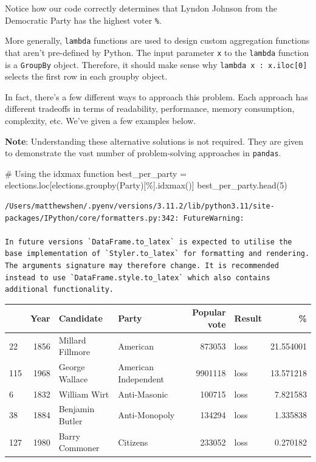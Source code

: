 \documentclass[
  letterpaper,
  DIV=11,
  numbers=noendperiod]{scrreprt}
\newenvironment{Shaded}{\begin{snugshade}}{\end{snugshade}}
\newcommand{\CommentTok}[1]{\textcolor[rgb]{0.37,0.37,0.37}{#1}}
\newcommand{\DecValTok}[1]{\textcolor[rgb]{0.68,0.00,0.00}{#1}}
\newcommand{\NormalTok}[1]{\textcolor[rgb]{0.00,0.23,0.31}{#1}}
\newcommand{\OperatorTok}[1]{\textcolor[rgb]{0.37,0.37,0.37}{#1}}
\newcommand{\StringTok}[1]{\textcolor[rgb]{0.13,0.47,0.30}{#1}}
\begin{document}
Notice how our code correctly determines that Lyndon Johnson from the
Democratic Party has the highest voter \texttt{\%}.

More generally, \texttt{lambda} functions are used to design custom
aggregation functions that aren't pre-defined by Python. The input
parameter \texttt{x} to the \texttt{lambda} function is a
\texttt{GroupBy} object. Therefore, it should make sense why
\texttt{lambda\ x\ :\ x.iloc{[}0{]}} selects the first row in each
groupby object.

In fact, there's a few different ways to approach this problem. Each
approach has different tradeoffs in terms of readability, performance,
memory consumption, complexity, etc. We've given a few examples below.

\textbf{Note}: Understanding these alternative solutions is not
required. They are given to demonstrate the vast number of
problem-solving approaches in \texttt{pandas}.

\begin{Shaded}
\begin{Highlighting}[]
\CommentTok{\# Using the idxmax function}
\NormalTok{best\_per\_party }\OperatorTok{=}\NormalTok{ elections.loc[elections.groupby(}\StringTok{\textquotesingle{}Party\textquotesingle{}}\NormalTok{)[}\StringTok{\textquotesingle{}\%\textquotesingle{}}\NormalTok{].idxmax()]}
\NormalTok{best\_per\_party.head(}\DecValTok{5}\NormalTok{)}
\end{Highlighting}
\end{Shaded}

\begin{verbatim}
/Users/matthewshen/.pyenv/versions/3.11.2/lib/python3.11/site-packages/IPython/core/formatters.py:342: FutureWarning:

In future versions `DataFrame.to_latex` is expected to utilise the base implementation of `Styler.to_latex` for formatting and rendering. The arguments signature may therefore change. It is recommended instead to use `DataFrame.style.to_latex` which also contains additional functionality.
\end{verbatim}

\begin{tabular}{lrllrlr}
\toprule
{} &  Year &         Candidate &                 Party &  Popular vote & Result &          \% \\
\midrule
22  &  1856 &  Millard Fillmore &              American &        873053 &   loss &  21.554001 \\
115 &  1968 &    George Wallace &  American Independent &       9901118 &   loss &  13.571218 \\
6   &  1832 &      William Wirt &          Anti-Masonic &        100715 &   loss &   7.821583 \\
38  &  1884 &   Benjamin Butler &         Anti-Monopoly &        134294 &   loss &   1.335838 \\
127 &  1980 &    Barry Commoner &              Citizens &        233052 &   loss &   0.270182 \\
\bottomrule
\end{tabular}
\end{document}
